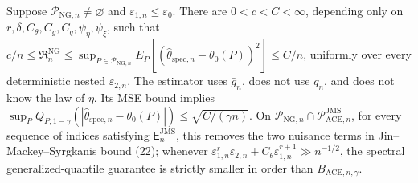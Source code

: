 Suppose \(\mathcal P_{\mathrm{NG},n}\neq\varnothing\) and \(\varepsilon_{1,n}\le\varepsilon_0\). There are \(0<c<C<\infty\), depending only on \(r,\delta,C_{\theta},C_g,C_q,\psi_{\eta},\psi_{\xi}\), such that \(c/n\le\mathfrak R_n^{\mathrm{NG}}\le\sup_{P\in\mathcal P_{\mathrm{NG},n}}E_P[(\widehat\theta_{\mathrm{spec},n}-\theta_0(P))^2]\le C/n\), uniformly over every deterministic nested \(\varepsilon_{2,n}\). The estimator uses \(\bar g_n\), does not use \(\bar q_n\), and does not know the law of \(\eta\). Its MSE bound implies \(\sup_PQ_{P,1-\gamma}(|\widehat\theta_{\mathrm{spec},n}-\theta_0(P)|)\le\sqrt{C/(\gamma n)}\). On \(\mathcal P_{\mathrm{NG},n}\cap\mathcal P_{\mathrm{ACE},n}^{\mathrm{JMS}}\), for every sequence of indices satisfying \(\mathsf E_n^{\mathrm{JMS}}\), this removes the two nuisance terms in Jin--Mackey--Syrgkanis bound (22); whenever \(\varepsilon_{1,n}^r\varepsilon_{2,n}+C_{\theta}\varepsilon_{1,n}^{r+1}\gg n^{-1/2}\), the spectral generalized-quantile guarantee is strictly smaller in order than \(B_{\mathrm{ACE},n,\gamma}\).